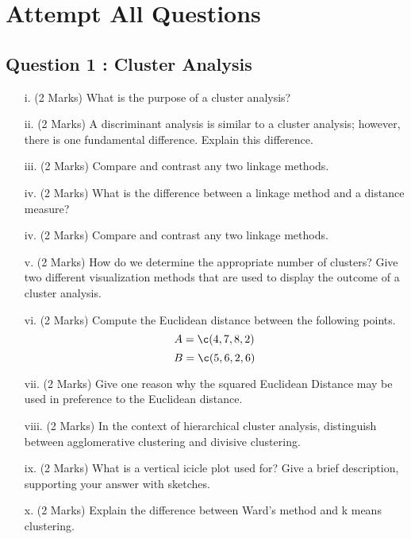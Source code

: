 \documentclass[a4paper,12pt]{article}
\begin{document}
\section*{Attempt All Questions}




\subsection*{Question 1 : Cluster Analysis}

\begin{itemize}
\item[i.](2 Marks) What is the purpose of a cluster analysis?

\item[ii.](2 Marks)  A discriminant analysis is similar to a cluster analysis; however, there is one fundamental difference.  Explain this difference.

\item[iii.](2 Marks)  Compare and contrast any two linkage methods.

\item[iv.](2 Marks)  What is the difference between a linkage method and a distance measure?

\item[iv.](2 Marks)  Compare and contrast any two linkage methods.

\item[v.](2 Marks)  How do we determine the appropriate number of clusters?  Give two different visualization methods that are used to display the outcome of a cluster analysis.

\item[vi.](2 Marks)  Compute the Euclidean distance between the following points.
\[ A = \c(4,7,8,2)\]
\[ B = \c(5,6,2,6)\]

\item[vii.](2 Marks)  Give one reason why the squared Euclidean Distance may be used in preference to the Euclidean distance.

\end{itemize}
\begin{itemize}
\item[viii.](2 Marks)  In the context of hierarchical cluster analysis, distinguish between agglomerative clustering and divisive clustering.
\item[ix.](2 Marks)  What is a vertical icicle plot used for? Give a brief description, supporting your answer with sketches.
\item[x.](2 Marks)  Explain the difference between Ward's method and k means
 clustering.
\end{itemize}
\newpage
\end{document}
